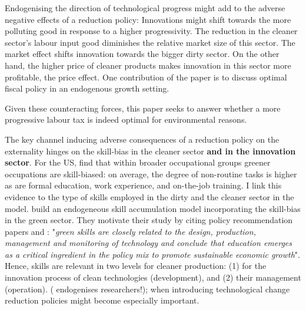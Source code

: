 Endogenising the direction of technological progress might add to the adverse negative effects of a reduction policy:
Innovations might shift towards the more polluting good in response to a higher progressivity. The reduction in the cleaner sector's labour input good diminishes the relative market size of this sector. The market effect shifts innovation towards the bigger dirty sector. On the other hand, the higher price of cleaner products makes innovation in this sector more profitable, the price effect. 
One contribution of the paper is to discuss optimal fiscal policy in an endogenous growth setting. 


Given these counteracting forces, this paper seeks to answer whether a more progressive labour tax is indeed optimal for environmental reasons. 

The key channel inducing adverse consequences of a reduction policy on the externality hinges on the skill-bias in the cleaner sector \textbf{and in the innovation sector}. %
For the US, \cite{Consoli2016DoCapital} find that within broader occupational groups greener occupations are skill-biased: on average, the degree of non-routine tasks is higher as are formal education, work experience, and on-the-job training. I link this evidence to the type of skills employed in the dirty and the cleaner sector in the model. %
\cite{Borissov2019CarbonDevelopment}
build an endogeneous skill accumulation model incorporating the skill-bias in the green sector. They motivate their study by citing policy recommendation papers and \cite{Vona2018EnvironmentalExploration}: "\textit{green skills are closely related to the design, production, management and monitoring of technology and conclude that education emerges as a critical ingredient in the policy mix to promote sustainable economic growth}". Hence, skills are relevant in two levels for cleaner production: (1) for the innovation process of clean technologies (development), and (2) their management (operation). (\cite{Fried2018ClimateAnalysis} endogenises researchers!); \ar when introducing technological change reduction policies might become especially important. 

